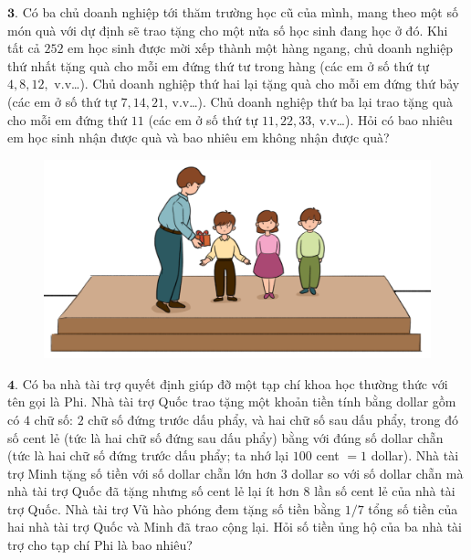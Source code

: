 \begin{multicols}{2}
\begin{figure}[H]
		\vspace*{-5pt}
	\end{figure}
	$\pmb{3.}$ 	Có ba chủ doanh nghiệp tới thăm trường học cũ của mình, mang theo một số món quà với dự định sẽ trao tặng cho một nửa số học sinh đang học ở đó. Khi tất cả $252$ em học sinh được mời xếp thành một hàng ngang, chủ doanh nghiệp thứ nhất tặng quà cho mỗi em đứng thứ tư trong hàng (các em ở số thứ tự $4,8,12,$ v.v\ldots). Chủ doanh nghiệp thứ hai lại tặng quà cho mỗi em đứng thứ bảy (các em ở số thứ tự $7,14,21$, v.v\ldots). Chủ doanh nghiệp thứ ba lại trao tặng quà cho mỗi em đứng thứ $11$ (các em ở số thứ tự $11,22,33$, v.v\ldots). Hỏi có bao nhiêu em học sinh nhận được quà và bao nhiêu em không nhận được quà?
	\begin{figure}[H]
		\centering
		\vspace*{-5pt}
		\captionsetup{labelformat= empty, justification=centering}
		\includegraphics[width=1\linewidth]{Hinh3}
		\vspace*{-15pt}
	\end{figure}
	$\pmb{4.}$ 	Có ba nhà tài trợ quyết định giúp đỡ một tạp chí khoa học thường thức với tên gọi là Phi. Nhà tài trợ Quốc trao tặng một khoản tiền tính bằng dollar gồm có $4$ chữ số: $2$ chữ số đứng trước dấu phẩy, và hai chữ số sau dấu phẩy, trong đó số cent lẻ (tức là hai chữ số đứng sau dấu phẩy) bằng với đúng số dollar chẵn (tức là hai chữ số đứng trước dấu phẩy; ta nhớ lại $100$ cent $= 1$ dollar). Nhà tài trợ Minh tặng số tiền với số dollar chẵn lớn hơn $3$ dollar so với số dollar chẵn mà nhà tài trợ Quốc đã tặng nhưng số cent lẻ lại ít hơn $8$ lần số cent lẻ của nhà tài trợ Quốc. Nhà tài trợ Vũ hào phóng đem tặng số tiền bằng $1/7$ tổng số tiền của hai nhà tài trợ Quốc và Minh đã trao cộng lại. Hỏi số tiền ủng hộ của ba nhà tài trợ cho tạp chí Phi là bao nhiêu?
	\begin{figure}[H]
		\centering

\end{figure}
\end{multicols}
